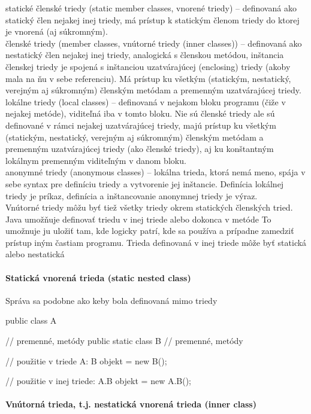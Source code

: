 statické členské triedy (static member classes, vnorené triedy) -- definovaná ako statický člen nejakej inej triedy, má prístup k statickým členom triedy do ktorej je vnorená (aj súkromným).\\
členské triedy (member classes, vnútorné triedy (inner classes)) -- definovaná ako nestatický člen nejakej inej triedy, analogická s členskou metódou, inštancia členskej triedy je spojená s inštanciou uzatvárajúcej (enclosing) triedy (akoby mala na ňu v sebe referenciu). Má prístup ku všetkým (statickým, nestatický, verejným aj súkromným) členským metódam a premenným uzatvárajúcej triedy.\\
lokálne triedy (local classes) -- definovaná v nejakom bloku programu (čiže v nejakej metóde), viditeľná iba v tomto bloku. Nie sú členské triedy ale sú definované v rámci nejakej uzatvárajúcej triedy, majú prístup ku všetkým (statickým, nestatický, verejným aj súkromným) členským metódam a premenným uzatvárajúcej triedy (ako členské triedy), aj ku konštantným lokálnym premenným viditeľným v danom bloku.\\
anonymné triedy (anonymous classes) -- lokálna trieda, ktorá nemá meno, spája v sebe syntax pre definíciu triedy a vytvorenie jej inštancie. Definícia lokálnej triedy je príkaz, definícia a inštancovanie anonymnej triedy je výraz.\\
Vnútorné triedy môžu byť tiež všetky triedy okrem statických členských tried.\\


		Java umožňuje definovať triedu v inej triede alebo dokonca v metóde
		To umožnuje ju uložiť tam, kde logicky patrí, kde sa používa a prípadne zamedziť prístup iným častiam programu.
		Trieda definovaná v inej triede môže byť statická alebo nestatická
		

		\paragraph{Statická vnorená trieda (static nested class)}

		Správa sa podobne ako keby bola definovaná mimo triedy
		
		public class A {
		   // premenné, metódy
		   public static class B {
		      // premenné, metódy
		   }
		   
		   // použitie v triede A:
		   B objekt = new B();
		}

		// použitie v inej triede:
		A.B objekt = new A.B();


		\paragraph{Vnútorná trieda, t.j. nestatická vnorená trieda (inner class)}

